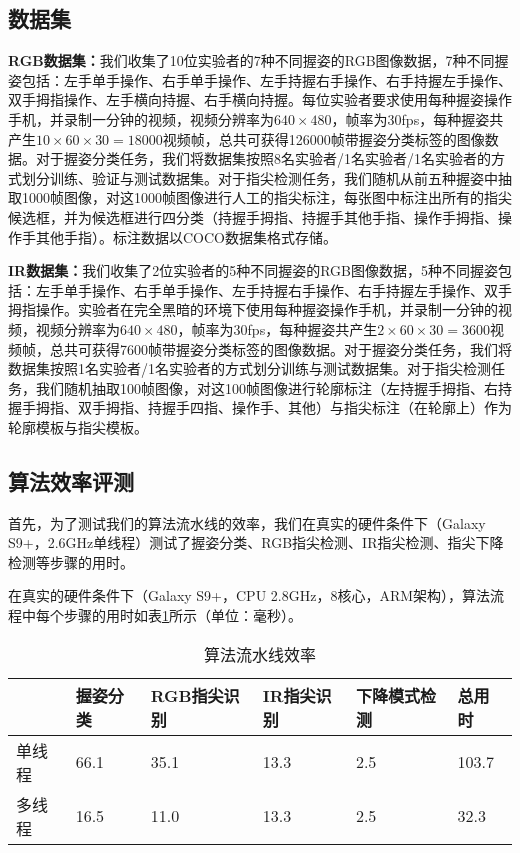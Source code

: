 \subsection{数据集}
\label{dataset}

\textbf{RGB数据集：}我们收集了10位实验者的7种不同握姿的RGB图像数据，7种不同握姿包括：左手单手操作、右手单手操作、左手持握右手操作、右手持握左手操作、双手拇指操作、左手横向持握、右手横向持握。每位实验者要求使用每种握姿操作手机，并录制一分钟的视频，视频分辨率为$640 \times 480$，帧率为30fps，每种握姿共产生$10 \times 60 \times 30=18000$视频帧，总共可获得126000帧带握姿分类标签的图像数据。对于握姿分类任务，我们将数据集按照8名实验者/1名实验者/1名实验者的方式划分训练、验证与测试数据集。对于指尖检测任务，我们随机从前五种握姿中抽取1000帧图像，对这1000帧图像进行人工的指尖标注，每张图中标注出所有的指尖候选框，并为候选框进行四分类（持握手拇指、持握手其他手指、操作手拇指、操作手其他手指）。标注数据以COCO数据集格式存储。

\textbf{IR数据集：}我们收集了2位实验者的5种不同握姿的RGB图像数据，5种不同握姿包括：左手单手操作、右手单手操作、左手持握右手操作、右手持握左手操作、双手拇指操作。实验者在完全黑暗的环境下使用每种握姿操作手机，并录制一分钟的视频，视频分辨率为$640 \times 480$，帧率为30fps，每种握姿共产生$2 \times 60 \times 30=3600$视频帧，总共可获得7600帧带握姿分类标签的图像数据。对于握姿分类任务，我们将数据集按照1名实验者/1名实验者的方式划分训练与测试数据集。对于指尖检测任务，我们随机抽取100帧图像，对这100帧图像进行轮廓标注（左持握手拇指、右持握手拇指、双手拇指、持握手四指、操作手、其他）与指尖标注（在轮廓上）作为轮廓模板与指尖模板。

\subsection{算法效率评测}

首先，为了测试我们的算法流水线的效率，我们在真实的硬件条件下（Galaxy S9+，2.6GHz单线程）测试了握姿分类、RGB指尖检测、IR指尖检测、指尖下降检测等步骤的用时。

在真实的硬件条件下（Galaxy S9+，CPU 2.8GHz，8核心，ARM架构），算法流程中每个步骤的用时如表\ref{tbl:alg_speed}所示（单位：毫秒）。

\begin{table}[htbp]
\centering
\caption{算法流水线效率}
\label{tbl:alg_speed}
\begin{tabular}{p{40 pt}p{50 pt}p{70 pt}p{70 pt}p{70 pt}p{40 pt}}
 \toprule
  & 握姿分类 & RGB指尖识别 & IR指尖识别 & 下降模式检测 & 总用时\\
 \midrule
单线程 & 66.1 & 35.1 & 13.3 & 2.5 & 103.7 \\
多线程 & 16.5 & 11.0 & 13.3 & 2.5 & 32.3 \\
\bottomrule
 \end{tabular}\\[2pt]
\end{table}

